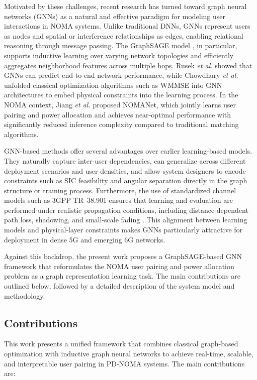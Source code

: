 \documentclass[conference]{IEEEtran}
\begin{document}
Motivated by these challenges, recent research has turned toward graph neural networks (GNNs) as a natural and effective paradigm for modeling user interactions in NOMA systems. Unlike traditional DNNs, GNNs represent users as nodes and spatial or interference relationships as edges, enabling relational reasoning through message passing. The GraphSAGE model \cite{hamilton2017inductive}, in particular, supports inductive learning over varying network topologies and efficiently aggregates neighborhood features across multiple hops. Rusek \textit{et al.} \cite{rusek2020graph} showed that GNNs can predict end-to-end network performance, while Chowdhury \textit{et al.} \cite{chowdhury2021unfolding} unfolded classical optimization algorithms such as WMMSE into GNN architectures to embed physical constraints into the learning process. In the NOMA context, Jiang \textit{et al.} \cite{jiang2021} proposed NOMANet, which jointly learns user pairing and power allocation and achieves near-optimal performance with significantly reduced inference complexity compared to traditional matching algorithms.

GNN-based methods offer several advantages over earlier learning-based models. They naturally capture inter-user dependencies, can generalize across different deployment scenarios and user densities, and allow system designers to encode constraints such as SIC feasibility and angular separation directly in the graph structure or training process. Furthermore, the use of standardized channel models such as 3GPP TR~38.901 ensures that learning and evaluation are performed under realistic propagation conditions, including distance-dependent path loss, shadowing, and small-scale fading \cite{3gpp38901,etis2024}. This alignment between learning models and physical-layer constraints makes GNNs particularly attractive for deployment in dense 5G and emerging 6G networks.

Against this backdrop, the present work proposes a GraphSAGE-based GNN framework that reformulates the NOMA user pairing and power allocation problem as a graph representation learning task. The main contributions are outlined below, followed by a detailed description of the system model and methodology.

\subsection{Contributions}

This work presents a unified framework that combines classical graph-based optimization with inductive graph neural networks to achieve real-time, scalable, and interpretable user pairing in PD-NOMA systems. The main contributions are:
\end{document}

